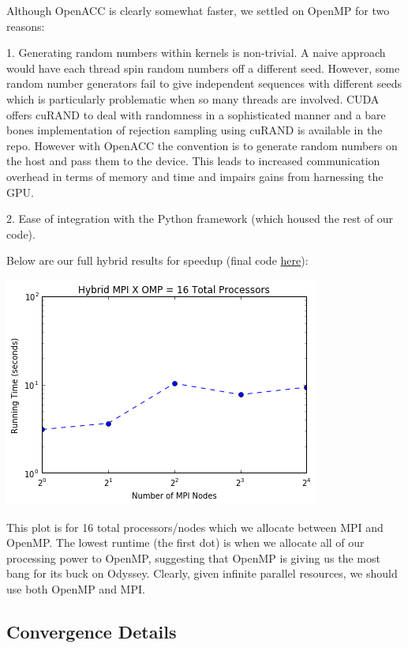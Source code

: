 \documentclass{article}
\begin{document}
Although OpenACC is clearly somewhat faster, we settled on OpenMP for two
reasons:

1. Generating random numbers within kernels is non-trivial. A naive approach
would have each thread spin random numbers off a different seed. However, some
random number generators fail to give independent sequences with different
seeds which is particularly problematic when so many threads are involved. CUDA
offers cuRAND to deal with randomness in a sophisticated manner and a bare
bones implementation of rejection sampling using cuRAND is available in the
repo. However with OpenACC the convention is to generate random numbers on the
host and pass them to the device. This leads to increased communication
overhead in terms of memory and time and impairs gains from harnessing the GPU.

2. Ease of integration with the Python framework (which housed the rest of our
code).

Below are our full hybrid results for speedup (final code
\href{https://github.com/asross/cs205-project/blob/master/odyssey_setup/teleporting_mcmc2}{here}):

\includegraphics[width=\textwidth]{hybrid-results.png}

This plot is for 16 total processors/nodes which we allocate between MPI and
OpenMP. The lowest runtime (the first dot) is when we allocate all of our
processing power to OpenMP, suggesting that OpenMP is giving us the most bang
for its buck on Odyssey. Clearly, given infinite parallel resources, we should
use both OpenMP and MPI.

\subsection{Convergence Details}
\end{document}
